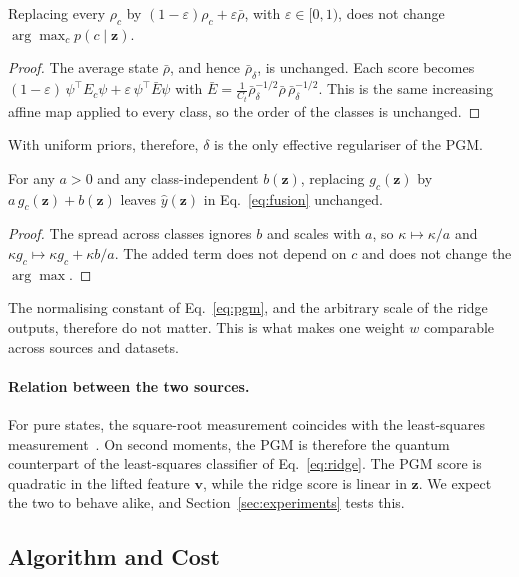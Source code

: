 \begin{proposition}\label{prop:shrink}
Replacing every $\rho_c$ by $(1-\varepsilon)\rho_c+\varepsilon\bar\rho$, with
$\varepsilon\in[0,1)$, does not change $\arg\max_c p(c\mid\mathbf z)$.
\end{proposition}
\begin{proof}
The average state $\bar\rho$, and hence $\bar\rho_\delta$, is unchanged. Each score
becomes $(1-\varepsilon)\,\psi^{\top}E_c\psi+\varepsilon\,\psi^{\top}\bar E\psi$
with $\bar E=\frac1{C_t}\bar\rho_\delta^{-1/2}\bar\rho\,\bar\rho_\delta^{-1/2}$. This
is the same increasing affine map applied to every class, so the order of
the classes is unchanged.
\end{proof}
\noindent With uniform priors, therefore, $\delta$ is the only effective
regulariser of the PGM.

\begin{proposition}\label{prop:scale}
For any $a>0$ and any class-independent $b(\mathbf z)$, replacing
$g_c(\mathbf z)$ by $a\,g_c(\mathbf z)+b(\mathbf z)$ leaves $\hat y(\mathbf z)$ in
Eq.~\eqref{eq:fusion} unchanged.
\end{proposition}
\begin{proof}
The spread across classes ignores $b$ and scales with $a$, so
$\kappa\mapsto\kappa/a$ and $\kappa g_c\mapsto\kappa g_c+\kappa b/a$. The added term
does not depend on $c$ and does not change the $\arg\max$.
\end{proof}
\noindent The normalising constant of Eq.~\eqref{eq:pgm}, and the arbitrary scale of
the ridge outputs, therefore do not matter. This is what makes one weight
$w$ comparable across sources and datasets.

\paragraph{Relation between the two sources.}
For pure states, the square-root measurement coincides with the
least-squares measurement~\cite{eldar2001srm}. On second moments, the PGM is
therefore the quantum counterpart of the least-squares classifier of
Eq.~\eqref{eq:ridge}. The PGM score is quadratic in the lifted feature
$\mathbf v$, while the ridge score is linear in $\mathbf z$. We expect the two to
behave alike, and Section~\ref{sec:experiments} tests this.

\subsection{Algorithm and Cost}

